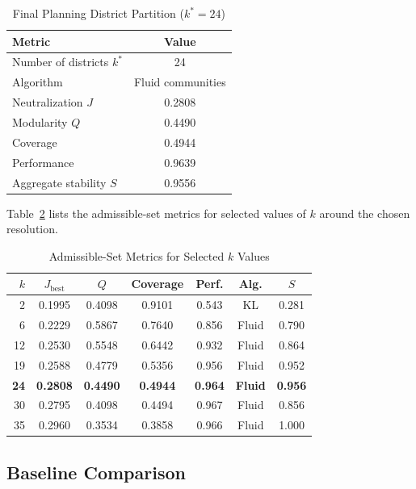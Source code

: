 \documentclass[conference]{IEEEtran}
\begin{document}
\begin{table}[t]
\centering
\caption{Final Planning District Partition ($k^*=24$)}
\label{tab:final_partition}
\small
\begin{tabular}{lc}
\toprule
Metric & Value \\
\midrule
Number of districts $k^*$ & 24 \\
Algorithm & Fluid communities \\
Neutralization $J$         & 0.2808 \\
Modularity $Q$             & 0.4490 \\
Coverage                   & 0.4944 \\
Performance                & 0.9639 \\
Aggregate stability $S$    & 0.9556 \\
\bottomrule
\end{tabular}
\end{table}

Table~\ref{tab:admissible_k} lists the admissible-set metrics for
selected values of $k$ around the chosen resolution.

\begin{table}[t]
\centering
\caption{Admissible-Set Metrics for Selected $k$ Values}
\label{tab:admissible_k}
\scriptsize
\begin{tabular}{rcccccc}
\toprule
$k$ & $J_{\mathrm{best}}$ & $Q$ & Coverage & Perf. & Alg. & $S$ \\
\midrule
 2 & 0.1995 & 0.4098 & 0.9101 & 0.543 & KL      & 0.281 \\
 6 & 0.2229 & 0.5867 & 0.7640 & 0.856 & Fluid   & 0.790 \\
12 & 0.2530 & 0.5548 & 0.6442 & 0.932 & Fluid   & 0.864 \\
19 & 0.2588 & 0.4779 & 0.5356 & 0.956 & Fluid   & 0.952 \\
\textbf{24} & \textbf{0.2808} & \textbf{0.4490} & \textbf{0.4944} & \textbf{0.964} & \textbf{Fluid} & \textbf{0.956} \\
30 & 0.2795 & 0.4098 & 0.4494 & 0.967 & Fluid   & 0.856 \\
35 & 0.2960 & 0.3534 & 0.3858 & 0.966 & Fluid   & 1.000 \\
\bottomrule
\end{tabular}
\end{table}

\subsection{Baseline Comparison}
\label{sec:baseline}
\end{document}
